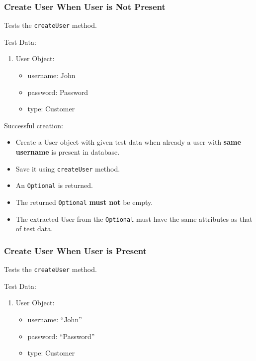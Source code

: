 \documentclass[]{article}
\providecommand{\tightlist}{%
  \setlength{\itemsep}{0pt}\setlength{\parskip}{0pt}}
\begin{document}
\hypertarget{create-user-when-user-is-not-present}{%
\subsubsection{Create User When User is Not
Present}\label{create-user-when-user-is-not-present}}

Tests the \texttt{createUser} method.

Test Data:

\begin{enumerate}
\def\labelenumi{\arabic{enumi}.}
\tightlist
\item
  User Object:

  \begin{itemize}
  \tightlist
  \item
    username: John
  \item
    password: Password
  \item
    type: Customer
  \end{itemize}
\end{enumerate}

Successful creation:

\begin{itemize}
\tightlist
\item
  Create a User object with given test data when already a user with
  \textbf{same username} is present in database.
\item
  Save it using \texttt{createUser} method.
\item
  An \texttt{Optional} is returned.
\item
  The returned \texttt{Optional} \textbf{must not} be empty.
\item
  The extracted User from the \texttt{Optional} must have the same
  attributes as that of test data.
\end{itemize}

\hypertarget{create-user-when-user-is-present}{%
\subsubsection{Create User When User is
Present}\label{create-user-when-user-is-present}}

Tests the \texttt{createUser} method.

Test Data:

\begin{enumerate}
\def\labelenumi{\arabic{enumi}.}
\tightlist
\item
  User Object:

  \begin{itemize}
  \tightlist
  \item
    username: ``John''
  \item
    password: ``Password''
  \item
    type: Customer
  \end{itemize}
\end{enumerate}
\end{document}
